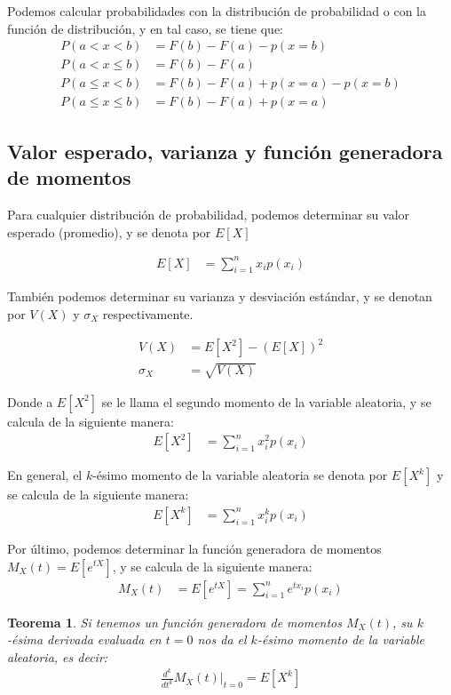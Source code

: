 \documentclass{article}
\theoremstyle{definition}
\theoremstyle{plain}
\newtheorem{theorem}[definition]{Teorema}
\theoremstyle{remark}
\begin{document}
Podemos calcular probabilidades con la distribución de probabilidad o con la función de distribución, y en tal  caso, se tiene que:
\begin{align*}
P(a < x < b) &= F(b) - F(a) - p(x = b) \\
P(a < x \leq b) &= F(b) - F(a) \\
P(a \leq x < b) &= F(b) - F(a) + p(x = a) - p(x = b) \\
P(a \leq x \leq b) &= F(b) - F(a) + p(x = a)
\end{align*}

\subsection{Valor esperado, varianza y función generadora de momentos}

Para cualquier distribución de probabilidad, podemos determinar su valor esperado (promedio), y se denota por $E[X]$

\begin{align*}
E[X] &= \sum_{i=1}^{n} x_i p(x_i)
\end{align*}

También podemos determinar su varianza y desviación estándar, y se denotan por $V(X)$ y $\sigma_X$ respectivamente.

\begin{align*}
V(X) &= E[X^2] - (E[X])^2 \\
\sigma_X &= \sqrt{V(X)}
\end{align*}

Donde a $E[X^2]$ se le llama el segundo momento de la variable aleatoria, y se calcula de la siguiente manera:
\begin{align*}
E[X^2] &= \sum_{i=1}^{n} x_i^2 p(x_i)
\end{align*}

En general, el $k$-ésimo momento de la variable aleatoria se denota por $E[X^k]$ y se calcula de la siguiente manera:
\begin{align*}
E[X^k] &= \sum_{i=1}^{n} x_i^k p(x_i)
\end{align*}

Por último, podemos determinar la función generadora de momentos $M_X(t) = E[e^{tX}]$, y se calcula de la siguiente manera:
\begin{align*}
M_X(t) &= E[e^{tX}] = \sum_{i=1}^{n} e^{tx_i} p(x_i)
\end{align*}

\begin{theorem}
Si tenemos un función generadora de momentos $M_X(t)$, su $k$-ésima derivada evaluada en $t=0$ nos da el $k$-ésimo momento de la variable aleatoria, es decir:
\begin{align*}
\frac{d^k}{dt^k} M_X(t) \bigg|_{t=0} = E[X^k]
\end{align*}
\end{theorem}
\end{document}
